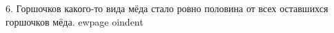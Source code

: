 6. Горшочков какого-то вида мёда стало ровно половина от всех оставшихся горшочков мёда.
ewpage
oindent
